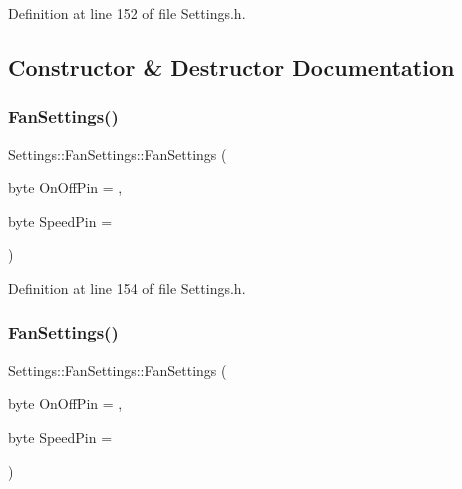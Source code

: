 Definition at line 152 of file Settings.\+h.



\subsection{Constructor \& Destructor Documentation}
\mbox{\label{struct_settings_1_1_fan_settings_a96ac1cf81f430913c2c12c622a932d69}} 
\subsubsection{\texorpdfstring{Fan\+Settings()}{FanSettings()}\hspace{0.1cm}{\footnotesize\ttfamily [1/2]}}
{\footnotesize\ttfamily Settings\+::\+Fan\+Settings\+::\+Fan\+Settings (\begin{DoxyParamCaption}\item[{byte}]{On\+Off\+Pin = {},  }\item[{byte}]{Speed\+Pin = {} }\end{DoxyParamCaption})\hspace{0.3cm}{\ttfamily [inline]}}



Definition at line 154 of file Settings.\+h.

\mbox{\label{struct_settings_1_1_fan_settings_a96ac1cf81f430913c2c12c622a932d69}} 
\subsubsection{\texorpdfstring{Fan\+Settings()}{FanSettings()}\hspace{0.1cm}{\footnotesize\ttfamily [2/2]}}
{\footnotesize\ttfamily Settings\+::\+Fan\+Settings\+::\+Fan\+Settings (\begin{DoxyParamCaption}\item[{byte}]{On\+Off\+Pin = {},  }\item[{byte}]{Speed\+Pin = {} }\end{DoxyParamCaption})\hspace{0.3cm}{\ttfamily [inline]}}



